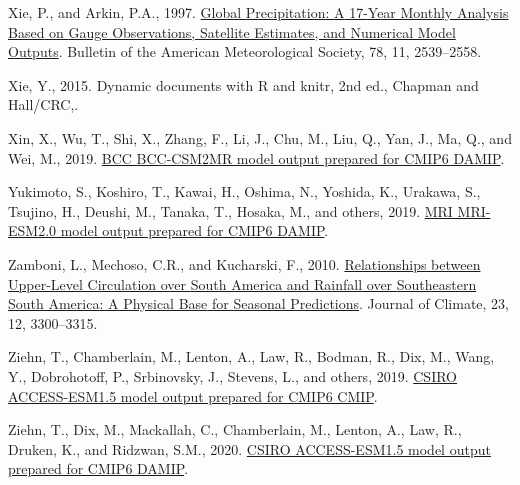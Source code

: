 \documentclass[12pt,oneside]{reedthesis}
\newlength{\cslhangindent}
\newenvironment{CSLReferences}[2] %
 {%
  \setlength{\parindent}{0pt}
  \ifodd #1 \everypar{\setlength{\hangindent}{\cslhangindent}}\ignorespaces\fi
  \ifnum #2 > 0
  \setlength{\parskip}{#2\baselineskip}
  \fi
 }%
 {}
\begin{document}
\begin{CSLReferences}{1}{0}
\leavevmode{}%
Xie, P., and Arkin, P.A., 1997. \href{https://doi.org/10.1175/1520-0477(1997)078\%3C2539:GPAYMA\%3E2.0.CO;2}{Global {Precipitation}: {A} 17-{Year Monthly Analysis Based} on {Gauge Observations}, {Satellite Estimates}, and {Numerical Model Outputs}}. Bulletin of the American Meteorological Society, 78, 11, 2539--2558.

\leavevmode{}%
Xie, Y., 2015. Dynamic documents with {R} and knitr, 2nd ed., {Chapman and Hall/CRC},.

\leavevmode{}%
Xin, X., Wu, T., Shi, X., Zhang, F., Li, J., Chu, M., Liu, Q., Yan, J., Ma, Q., and Wei, M., 2019. \href{https://doi.org/10.22033/ESGF/CMIP6.1726}{BCC BCC-CSM2MR model output prepared for CMIP6 DAMIP}.

\leavevmode{}%
Yukimoto, S., Koshiro, T., Kawai, H., Oshima, N., Yoshida, K., Urakawa, S., Tsujino, H., Deushi, M., Tanaka, T., Hosaka, M., and others, 2019. \href{https://doi.org/10.22033/ESGF/CMIP6.634}{MRI MRI-ESM2.0 model output prepared for CMIP6 DAMIP}.

\leavevmode{}%
Zamboni, L., Mechoso, C.R., and Kucharski, F., 2010. \href{https://doi.org/10.1175/2009JCLI3129.1}{Relationships between {Upper-Level Circulation} over {South America} and {Rainfall} over {Southeastern South America}: {A Physical Base} for {Seasonal Predictions}}. Journal of Climate, 23, 12, 3300--3315.

\leavevmode{}%
Ziehn, T., Chamberlain, M., Lenton, A., Law, R., Bodman, R., Dix, M., Wang, Y., Dobrohotoff, P., Srbinovsky, J., Stevens, L., and others, 2019. \href{https://doi.org/10.22033/ESGF/CMIP6.2288}{CSIRO ACCESS-ESM1.5 model output prepared for CMIP6 CMIP}.

\leavevmode{}%
Ziehn, T., Dix, M., Mackallah, C., Chamberlain, M., Lenton, A., Law, R., Druken, K., and Ridzwan, S.M., 2020. \href{https://doi.org/10.22033/ESGF/CMIP6.14362}{CSIRO ACCESS-ESM1.5 model output prepared for CMIP6 DAMIP}.

\end{CSLReferences}


\end{document}
